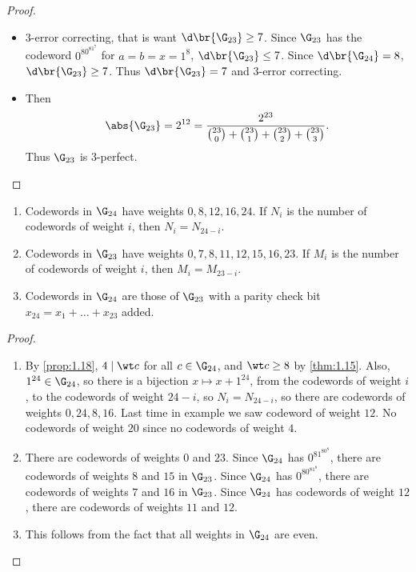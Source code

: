 \begin{proof}
\hfill
\begin{itemize}
\item $ 3 $-error correcting, that is want $ \d\br{\G_{23}} \ge 7 $. Since $ \G_{23} $ has the codeword $ 0^80^81^7 $ for $ a = b = x = 1^8 $, $ \d\br{\G_{23}} \le 7 $. Since $ \d\br{\G_{24}} = 8 $, $ \d\br{\G_{23}} \ge 7 $. Thus $ \d\br{\G_{23}} = 7 $ and $ 3 $-error correcting.
\item Then
$$ \abs{\G_{23}} = 2^{12} = \dfrac{2^{23}}{\binom{23}{0} + \binom{23}{1} + \binom{23}{2} + \binom{23}{3}}. $$
Thus $ \G_{23} $ is $ 3 $-perfect.
\end{itemize}
\end{proof}

\begin{proposition}
\hfill
\begin{enumerate}
\item Codewords in $ \G_{24} $ have weights $ 0, 8, 12, 16, 24 $. If $ N_i $ is the number of codewords of weight $ i $, then $ N_i = N_{24 - i} $.
\item Codewords in $ \G_{23} $ have weights $ 0, 7, 8, 11, 12, 15, 16, 23 $. If $ M_i $ is the number of codewords of weight $ i $, then $ M_i = M_{23 - i} $.
\item Codewords in $ \G_{24} $ are those of $ \G_{23} $ with a parity check bit $ x_{24} = x_1 + \dots + x_{23} $ added.
\end{enumerate}
\end{proposition}

\begin{proof}
\hfill
\begin{enumerate}
\item By \ref{prop:1.18}, $ 4 \mid \wt c $ for all $ c \in \G_{24} $, and $ \wt c \ge 8 $ by \ref{thm:1.15}. Also, $ 1^{24} \in \G_{24} $, so there is a bijection $ x \mapsto x + 1^{24} $, from the codewords of weight $ i $, to the codewords of weight $ 24 - i $, so $ N_i = N_{24 - i} $, so there are codewords of weights $ 0, 24, 8, 16 $. Last time in example we saw codeword of weight $ 12 $. No codewords of weight $ 20 $ since no codewords of weight $ 4 $.
\item There are codewords of weights $ 0 $ and $ 23 $. Since $ \G_{24} $ has $ 0^81^80^8 $, there are codewords of weights $ 8 $ and $ 15 $ in $ \G_{23} $. Since $ \G_{24} $ has $ 0^80^81^8 $, there are codewords of weights $ 7 $ and $ 16 $ in $ \G_{23} $. Since $ \G_{24} $ has codewords of weight $ 12 $, there are codewords of weights $ 11 $ and $ 12 $.
\item This follows from the fact that all weights in $ \G_{24} $ are even.
\end{enumerate}
\end{proof}

